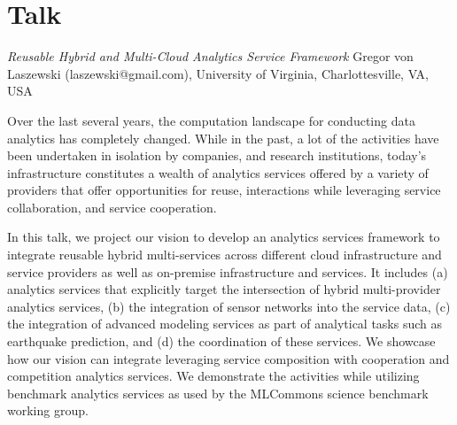 
\section{Talk}

\textit{Reusable Hybrid and Multi-Cloud Analytics Service Framework}
Gregor von Laszewski (laszewski@gmail.com),
University of Virginia, 
Charlottesville, VA, USA

Over the last several years, the computation landscape for conducting 
data analytics has completely changed. While in the past,
a lot of the activities have been undertaken in isolation by companies,
and research institutions, today's infrastructure constitutes a wealth
of analytics services offered by a variety of providers that offer opportunities
for reuse, interactions while leveraging service collaboration, and service cooperation.

In this talk, we project our vision to develop an analytics services framework to integrate reusable hybrid multi-services across different cloud infrastructure and service providers as well 
as on-premise infrastructure and services. It includes (a) analytics services that explicitly target the intersection of hybrid multi-provider analytics services, (b) the integration of sensor networks into the service data, (c) the integration of advanced modeling services as part of analytical tasks such as earthquake prediction, and (d) the coordination of these services. We showcase how our vision can integrate leveraging service composition with cooperation and competition analytics services. We demonstrate the activities while utilizing benchmark analytics services as used by the  MLCommons science benchmark working group.